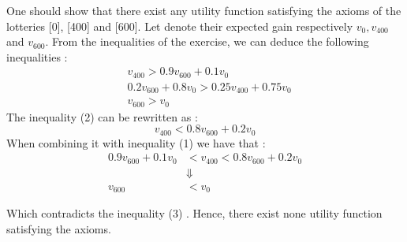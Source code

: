 One should show that there exist any utility function satisfying the axioms of the lotteries [0], [400] and [600].   Let denote their expected gain respectively $v_0,v_{400}$ and $v_{600}$. From the inequalities of the exercise, we can deduce the following inequalities : 
\begin{align}
&v_{400} > 0.9v_{600} +0.1 v_0  \\
&0.2v_{600} + 0.8v_0 > 0.25v_{400} +0.75v_0 \\
&v_{600} > v_0 
\end{align}
The inequality (2) can be rewritten as : 
$$v_{400} < 0.8v_{600} +0.2v_0$$ 
When combining it with inequality (1) we have that : 
\begin{align*}
    0.9v_{600} +0.1 v_0 &< v_{400} < 0.8v_{600} +0.2v_0\\
     &\Downarrow \\
     v_{600}&<v_0
\end{align*}

Which contradicts the inequality (3) . Hence, there exist none utility function satisfying the axioms.
